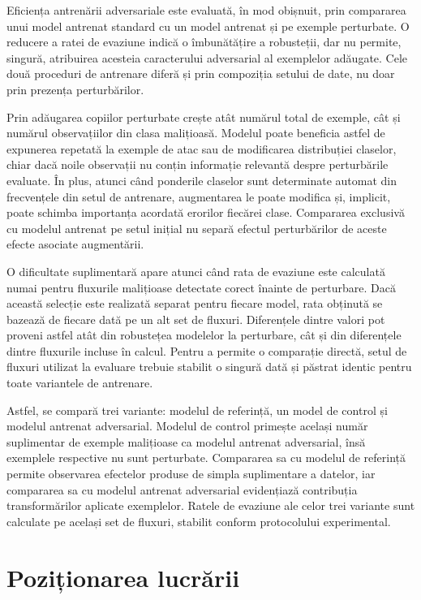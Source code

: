 Eficiența antrenării adversariale este evaluată, în mod obișnuit, prin compararea unui model antrenat standard cu un model antrenat și pe exemple perturbate. O reducere a ratei de evaziune indică o îmbunătățire a robusteții, dar nu permite, singură, atribuirea acesteia caracterului adversarial al exemplelor adăugate. Cele două proceduri de antrenare diferă și prin compoziția setului de date, nu doar prin prezența perturbărilor.

Prin adăugarea copiilor perturbate crește atât numărul total de exemple, cât și numărul observațiilor din clasa malițioasă. Modelul poate beneficia astfel de expunerea repetată la exemple de atac sau de modificarea distribuției claselor, chiar dacă noile observații nu conțin informație relevantă despre perturbările evaluate. În plus, atunci când ponderile claselor sunt determinate automat din frecvențele din setul de antrenare, augmentarea le poate modifica și, implicit, poate schimba importanța acordată erorilor fiecărei clase. Compararea exclusivă cu modelul antrenat pe setul inițial nu separă efectul perturbărilor de aceste efecte asociate augmentării.

O dificultate suplimentară apare atunci când rata de evaziune este calculată numai pentru fluxurile malițioase detectate corect înainte de perturbare. Dacă această selecție este realizată separat pentru fiecare model, rata obținută se bazează de fiecare dată pe un alt set de fluxuri. Diferențele dintre valori pot proveni astfel atât din robustețea modelelor la perturbare, cât și din diferențele dintre fluxurile incluse în calcul. Pentru a permite o comparație directă, setul de fluxuri utilizat la evaluare trebuie stabilit o singură dată și păstrat identic pentru toate variantele de antrenare.

Astfel, se compară trei variante: modelul de referință, un model de control și modelul antrenat adversarial. Modelul de control primește același număr suplimentar de exemple malițioase ca modelul antrenat adversarial, însă exemplele respective nu sunt perturbate. Compararea sa cu modelul de referință permite observarea efectelor produse de simpla suplimentare a datelor, iar compararea sa cu modelul antrenat adversarial evidențiază contribuția transformărilor aplicate exemplelor. Ratele de evaziune ale celor trei variante sunt calculate pe același set de fluxuri, stabilit conform protocolului experimental.

\section{Poziționarea lucrării}\label{sec:pozitionare}

